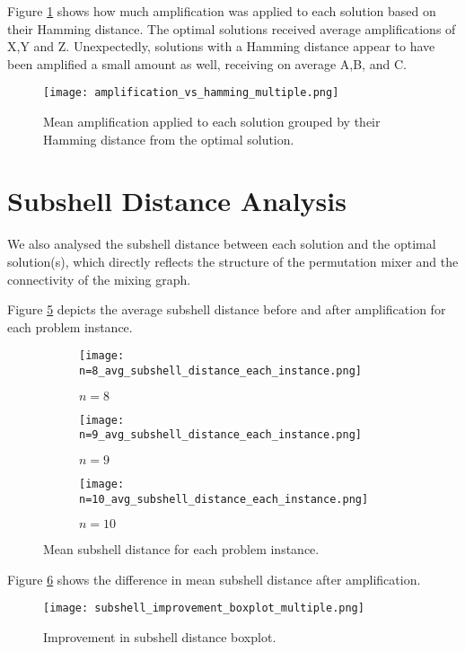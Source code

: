 Figure \ref{fig:amp vs ham} shows how much amplification was applied to each solution based on their Hamming distance. The optimal solutions received average amplifications of X,Y and Z. Unexpectedly, solutions with a Hamming distance appear to have been amplified a small amount as well, receiving on average A,B, and C.
\begin{figure}[htbp]
    \centering
    \texttt{[image: amplification\_vs\_hamming\_multiple.png]}
    \caption{Mean amplification applied to each solution grouped by their Hamming distance from the optimal solution.}
    \label{fig:amp vs ham}
\end{figure}



\section{Subshell Distance Analysis}
We also analysed the subshell distance between each solution and the optimal solution(s), which directly reflects the structure of the permutation mixer and the connectivity of the mixing graph.

Figure \ref{fig:avg sub} depicts the average subshell distance before and after amplification for each problem instance.
\begin{figure}[htbp]
     \centering
     \begin{subfigure}{0.45\textwidth}
         \centering
         \texttt{[image: n=8\_avg\_subshell\_distance\_each\_instance.png]}
         \caption{$n=8$}
         \label{fig:avg sub 8}
     \end{subfigure}
     \hfill
     \begin{subfigure}{0.45\textwidth}
         \centering
         \texttt{[image: n=9\_avg\_subshell\_distance\_each\_instance.png]}
         \caption{$n=9$}
         \label{fig:avg sub 9}
     \end{subfigure}
     \hfill
     \begin{subfigure}{\textwidth}
         \centering
         \texttt{[image: n=10\_avg\_subshell\_distance\_each\_instance.png]}
         \caption{$n=10$}
         \label{fig:avg sub 10}
     \end{subfigure}
        \caption{Mean subshell distance for each problem instance.}
        \label{fig:avg sub}
\end{figure}

Figure \ref{fig:sub improvement} shows the difference in mean subshell distance after amplification.
\begin{figure}[htbp]
    \centering
    \texttt{[image: subshell\_improvement\_boxplot\_multiple.png]}
    \caption{Improvement in subshell distance boxplot.}
    \label{fig:sub improvement}
\end{figure}

